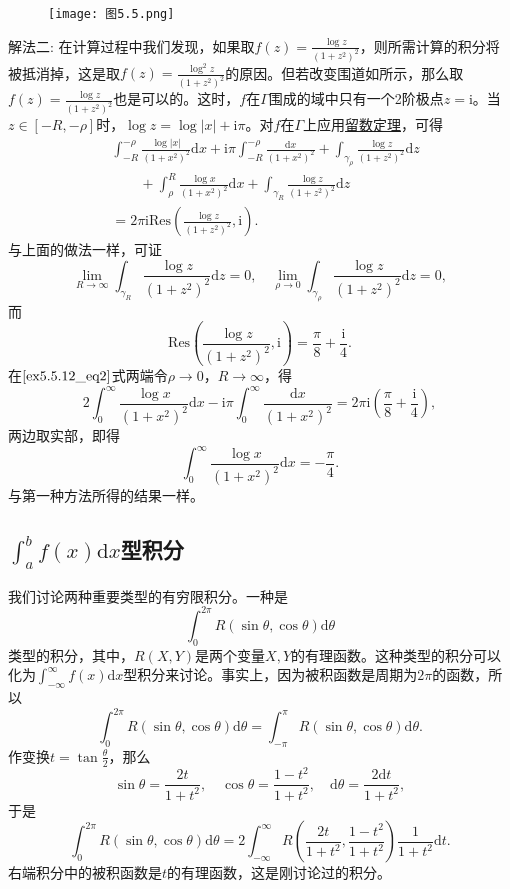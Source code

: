 \documentclass[../../main.tex]{subfiles}
\begin{document}
\begin{solution}
\begin{figure}[H]
\centering
\texttt{[image: 图5.5.png]}
\caption{}
\label{figure:图5.5}
\end{figure}
{\color{blue}解法二:}
在计算过程中我们发现，如果取\( f(z) = \frac{\log z}{(1 + z^2)^2} \)，则所需计算的积分将被抵消掉，这是取\( f(z) = \frac{\log^2 z}{(1 + z^2)^2} \)的原因。但若改变围道如所示，那么取\( f(z) = \frac{\log z}{(1 + z^2)^2} \)也是可以的。这时，\( f \)在\( \Gamma \)围成的域中只有一个2阶极点\( z = \mathrm{i} \)。当\( z \in [-R, -\rho] \)时，\( \log z = \log|x| + \mathrm{i}\pi \)。对\( f \)在\( \Gamma \)上应用\hyperref[theorem:留数定理(残数定理)-定理5.4.9]{留数定理}，可得
\begin{align}
&\int_{-R}^{-\rho}{\frac{\log |x|}{(1+x^2)^2}\mathrm{d}x}+\mathrm{i}\pi \int_{-R}^{-\rho}{\frac{\mathrm{d}x}{(1+x^2)^2}}+\int_{\gamma _{\rho}}{\frac{\log z}{(1+z^2)^2}\mathrm{d}z}\nonumber
\\
&\quad \quad+\int_{\rho}^R{\frac{\log x}{(1+x^2)^2}\mathrm{d}x}+\int_{\gamma _R}{\frac{\log z}{(1+z^2)^2}\mathrm{d}z}\nonumber
\\
&=2\pi \mathrm{iRes}\left( \frac{\log z}{(1+z^2)^2},\mathrm{i} \right) . \label{ex5.5.12_eq2}
\end{align}
与上面的做法一样，可证
\[
\lim_{R \to \infty} \int_{\gamma_R} \frac{\log z}{(1 + z^2)^2} \mathrm{d}z = 0,
\quad
\lim_{\rho \to 0} \int_{\gamma_{\rho}} \frac{\log z}{(1 + z^2)^2} \mathrm{d}z = 0,
\]
而
\[
\mathrm{Res}\left( \frac{\log z}{(1 + z^2)^2}, \mathrm{i} \right) = \frac{\pi}{8} + \frac{\mathrm{i}}{4}.
\]
在\(\eqref{ex5.5.12_eq2}\)式两端令\( \rho \to 0 \)，\( R \to \infty \)，得
\[
2\int_{0}^{\infty} \frac{\log x}{(1 + x^2)^2} \mathrm{d}x - \mathrm{i}\pi \int_{0}^{\infty} \frac{\mathrm{d}x}{(1 + x^2)^2} = 2\pi \mathrm{i} \left( \frac{\pi}{8} + \frac{\mathrm{i}}{4} \right),
\]
两边取实部，即得
\[
\int_{0}^{\infty} \frac{\log x}{(1 + x^2)^2} \mathrm{d}x = -\frac{\pi}{4}.
\]
与第一种方法所得的结果一样。

\end{solution}

\subsection{$\int_a^b{f\left( x \right) \mathrm{d}x}$型积分}

我们讨论两种重要类型的有穷限积分。一种是
\[
\int_{0}^{2\pi} R(\sin\theta, \cos\theta) \mathrm{d}\theta
\]
类型的积分，其中，\( R(X, Y) \)是两个变量\( X, Y \)的有理函数。这种类型的积分可以化为\( \int_{-\infty}^{\infty} f(x) \mathrm{d}x \)型积分来讨论。事实上，因为被积函数是周期为\( 2\pi \)的函数，所以
\[
\int_{0}^{2\pi} R(\sin\theta, \cos\theta) \mathrm{d}\theta = \int_{-\pi}^{\pi} R(\sin\theta, \cos\theta) \mathrm{d}\theta.
\]
作变换\( t = \tan \frac{\theta}{2} \)，那么
\[
\sin\theta = \frac{2t}{1 + t^2},
\quad
\cos\theta = \frac{1 - t^2}{1 + t^2},
\quad
\mathrm{d}\theta = \frac{2\mathrm{d}t}{1 + t^2},
\]
于是
\[
\int_{0}^{2\pi} R(\sin\theta, \cos\theta) \mathrm{d}\theta = 2 \int_{-\infty}^{\infty} R\left( \frac{2t}{1 + t^2}, \frac{1 - t^2}{1 + t^2} \right) \frac{1}{1 + t^2} \mathrm{d}t.
\]
右端积分中的被积函数是\( t \)的有理函数，这是刚讨论过的积分。
\end{document}
